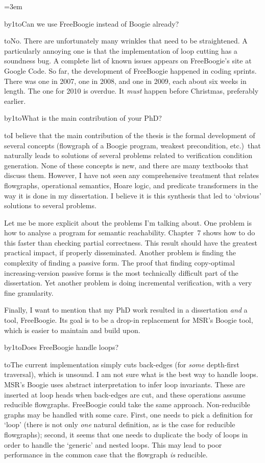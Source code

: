 \parindent=3em
\def\para#1{\noindent\hbox to\parindent{\hss\bf#1 }}
\newcount\qcnt{}
\def\A{\medskip\para{A\number\qcnt:}}
\def\Q{\bigskip{}\advance\qcnt by1\para{Q\number\qcnt:}}
\def\limp{\Rightarrow}

\Q Can we use FreeBoogie instead of Boogie already?

\A No. There are unfortunately many wrinkles that need to be straightened.
A particularly annoying one is that the implementation of loop cutting has
a soundness bug. A complete list of known issues appears on FreeBoogie's
site at Google Code. So far, the development of FreeBoogie happened in
coding sprints. There was one in 2007, one in 2008, and one in 2009, each
about six weeks in length. The one for 2010 is overdue. It {\it must\/}
happen before Christmas, preferably earlier.

\Q What is the main contribution of your PhD?

\A I believe that the main contribution of the thesis is the formal
development of several concepts (flowgraph of a Boogie program, weakest
precondition, etc.)\ that naturally leads to solutions of several problems
related to verification condition generation. None of these concepts is
new, and there are many textbooks that discuss them. However, I have not
seen any comprehensive treatment that relates flowgraphs, operational
semantics, Hoare logic, and predicate transformers in the way it is done in
my dissertation.  I believe it is this synthesis that led to `obvious'
solutions to several problems.

Let me be more explicit about the problems I'm talking about.  One problem
is how to analyse a program for semantic reachability.  Chapter~7 shows how
to do this faster than checking partial correctness.  This result should
have the greatest practical impact, if properly disseminated. Another
problem is finding the complexity of finding a passive form. The proof that
finding copy-optimal increasing-version passive forms is the most
technically difficult part of the dissertation. Yet another problem is
doing incremental verification, with a very fine granularity.

Finally, I want to mention that my PhD work resulted in a dissertation {\it
and\/} a tool, FreeBoogie. Its goal is to be a drop-in replacement for
MSR's Boogie tool, which is easier to maintain and build upon.


\Q Does FreeBoogie handle loops?

\A The current implementation simply cuts back-edges (for {\it some\/}
depth-first traversal), which is unsound. I am not sure what is the best
way to handle loops. MSR's Boogie uses abstract interpretation to infer
loop invariants. These are inserted at loop heads when back-edges are cut,
and these operations assume reducible flowgraphs. FreeBoogie could take the
same approach. Non-reducible graphs may be handled with some care. First,
one needs to pick a definition for `loop' (there is not only {\it one\/}
natural definition, as is the case for reducible flowgraphs); second, it
seems that one needs to duplicate the body of loops in order to handle the
`generic' and nested loops. This may lead to poor performance in the common
case that the flowgraph {\it is\/} reducible.

